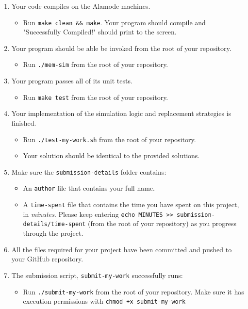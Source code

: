 \documentclass[10pt]{article}
\begin{document}
\begin{enumerate}
    \item Your code compiles on the Alamode machines.
    \begin{itemize}
        \item Run \texttt{make clean \&\& make}. Your program should compile and "Successfully Compiled!" should print to the screen.
    \end{itemize}
    \item Your program should be able be invoked from the root of your repository.
    \begin{itemize}
        \item Run \texttt{./mem-sim} from the root of your repository.
    \end{itemize}
    \item Your program passes all of its unit tests.
    \begin{itemize}
        \item Run \texttt{make test} from the root of your repository.
    \end{itemize}
    \item Your implementation of the simulation logic and replacement strategies is finished.
    \begin{itemize}
        \item Run \texttt{./test-my-work.sh} from the root of your repository.
        \item Your solution should be identical to the provided solutions.
    \end{itemize}
    \item Make sure the \texttt{submission-details} folder contains:
    \begin{itemize}
        \item An \texttt{author} file that contains your full name.
        \item A \texttt{time-spent} file that contains the time you have spent on this project, in \textit{minutes}. Please keep entering \texttt{echo MINUTES >> submission-details/time-spent} (from the root of your repository) as you progress through the project.
    \end{itemize}
    \item All the files required for your project have been committed and pushed to your GitHub repository.
    \item The submission script, \texttt{submit-my-work} successfully runs:
    \begin{itemize}
        \item Run \texttt{./submit-my-work} from the root of your repository. Make sure it has execution permissions with \texttt{chmod +x submit-my-work}
    \end{itemize}
\end{enumerate}
\end{document}
